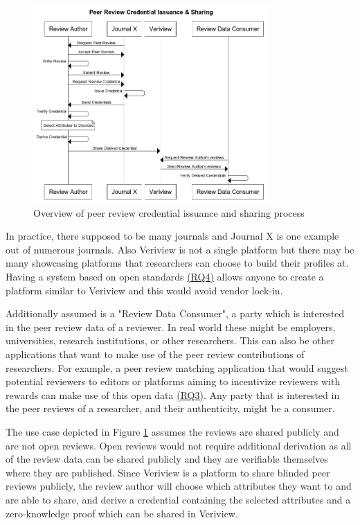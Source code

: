 \begin{figure}[htpb]
  \centering
  \includegraphics[width=0.8\textwidth]{figures/sequence.png}
  \caption{Overview of peer review credential issuance and sharing process} \label{fig:sequence1}
\end{figure}

In practice, there supposed to be many journals and Journal X is one example out of numerous journals. Also Veriview is not a single platform but there may be many showcasing platforms that researchers can choose to build their profiles at. Having a system based on open standards \hyperref[rq:open-standards]{(RQ4)} allows anyone to create a platform similar to Veriview and this would avoid vendor lock-in. 

Additionally assumed is a "Review Data Consumer", a party which is interested in the peer review data of a reviewer. In real world these might be employers, universities, research institutions, or other researchers. This can also be other applications that want to make use of the peer review contributions of researchers. For example, a peer review matching application that would suggest potential reviewers to editors or platforms aiming to incentivize reviewers \parencite{TenorioFornes.2019, Jan.2018c, TrovoMassari} with rewards can make use of this open data \hyperref[rq:open-data]{(RQ3)}.  Any party that is interested in the peer reviews of a researcher, and their authenticity, might be a consumer. 

The use case depicted in Figure \ref{fig:sequence1} assumes the reviews are shared publicly and are not open reviews. Open reviews would not require additional derivation as all of the review data can be shared publicly and they are verifiable themselves where they are published. Since Veriview is a platform to share blinded peer reviews publicly, the review author will choose which attributes they want to and are able to share, and derive a credential containing the selected attributes and a zero-knowledge proof which can be shared in Veriview. 

